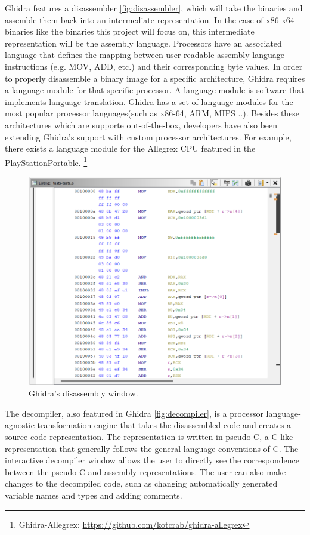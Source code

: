 Ghidra features a disassembler \ref{fig:disassembler}, which will take the binaries and assemble them back into an intermediate representation. In the case of x86-x64 binaries like the binaries this project will focus on, this intermediate representation will be the assembly language. Processors have an associated language that defines the mapping
between user-readable assembly language instructions (e.g. MOV, ADD, etc.) and their corresponding byte values. In order to properly disassemble a binary image for a specific architecture, Ghidra requires a language module for that specific processor. A language module is software that implements language translation. Ghidra has a set of language modules for the most popular processor languages(such as x86-64, ARM, MIPS ..). Besides these architectures which are supporte out-of-the-box, developers have also been extending Ghidra's support with custom processor architectures. For example, there exists a language module for the Allegrex CPU featured in the PlayStationPortable.  \footnote{Ghidra-Allegrex: \url{https://github.com/kotcrab/ghidra-allegrex}}
\label{fig:disassembler}
\begin{figure}[H]
  \centering
  \includegraphics[width=\linewidth]{img/disassembler.png}
  \caption{Ghidra's disassembly window.}
\end{figure}

The decompiler, also featured in Ghidra \ref{fig:decompiler}, is a processor language-agnostic transformation engine that takes the disassembled code and creates a source code representation. The representation is written in pseudo-C, a C-like representation that generally follows the general language conventions of C. The interactive decompiler window allows the user to directly see the correspondence between the pseudo-C and assembly representations. The user can also make changes to the decompiled code, such as changing automatically generated variable names and types and adding comments. 

